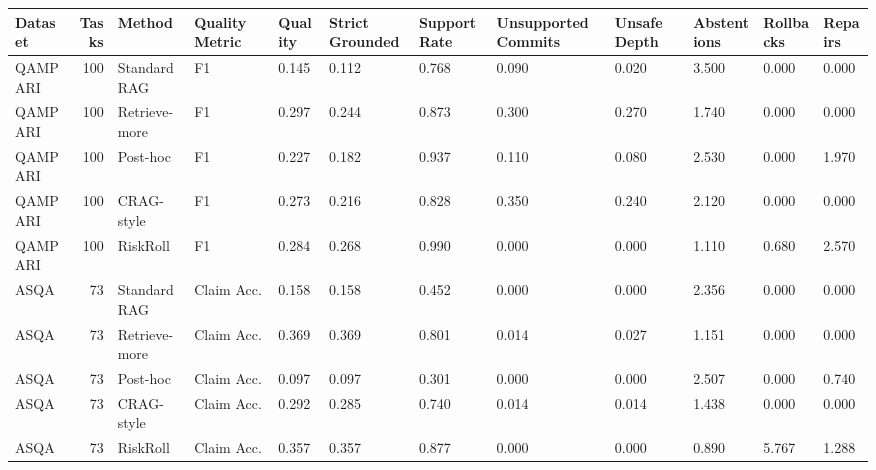 \begin{tabular}{lrllllllllll}
\toprule
Dataset & Tasks & Method & Quality Metric & Quality & Strict Grounded & Support Rate & Unsupported Commits & Unsafe Depth & Abstentions & Rollbacks & Repairs \\
\midrule
QAMPARI & 100 & Standard RAG & F1 & 0.145 & 0.112 & 0.768 & 0.090 & 0.020 & 3.500 & 0.000 & 0.000 \\
QAMPARI & 100 & Retrieve-more & F1 & 0.297 & 0.244 & 0.873 & 0.300 & 0.270 & 1.740 & 0.000 & 0.000 \\
QAMPARI & 100 & Post-hoc & F1 & 0.227 & 0.182 & 0.937 & 0.110 & 0.080 & 2.530 & 0.000 & 1.970 \\
QAMPARI & 100 & CRAG-style & F1 & 0.273 & 0.216 & 0.828 & 0.350 & 0.240 & 2.120 & 0.000 & 0.000 \\
QAMPARI & 100 & RiskRoll & F1 & 0.284 & 0.268 & 0.990 & 0.000 & 0.000 & 1.110 & 0.680 & 2.570 \\
ASQA & 73 & Standard RAG & Claim Acc. & 0.158 & 0.158 & 0.452 & 0.000 & 0.000 & 2.356 & 0.000 & 0.000 \\
ASQA & 73 & Retrieve-more & Claim Acc. & 0.369 & 0.369 & 0.801 & 0.014 & 0.027 & 1.151 & 0.000 & 0.000 \\
ASQA & 73 & Post-hoc & Claim Acc. & 0.097 & 0.097 & 0.301 & 0.000 & 0.000 & 2.507 & 0.000 & 0.740 \\
ASQA & 73 & CRAG-style & Claim Acc. & 0.292 & 0.285 & 0.740 & 0.014 & 0.014 & 1.438 & 0.000 & 0.000 \\
ASQA & 73 & RiskRoll & Claim Acc. & 0.357 & 0.357 & 0.877 & 0.000 & 0.000 & 0.890 & 5.767 & 1.288 \\
\bottomrule
\end{tabular}
